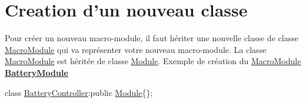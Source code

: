 \hypertarget{R_xC3_xA9f_xC3_xA9rence_classCreation}{}\section{Creation d'un nouveau classe}\label{R_xC3_xA9f_xC3_xA9rence_classCreation}
Pour créer un nouveau macro-\/module, il faut hériter une nouvelle classe de classe \hyperlink{classMacroModule}{Macro\-Module} qui va représenter votre nouveau macro-\/module. La classe \hyperlink{classMacroModule}{Macro\-Module} est héritée de classe \hyperlink{classModule}{Module}. Exemple de création du \hyperlink{classMacroModule}{Macro\-Module} {\bfseries \hyperlink{classBatteryModule}{Battery\-Module}}

{\ttfamily class \hyperlink{classBatteryController}{Battery\-Controller}\-:public \hyperlink{classModule}{Module}\{\};}

